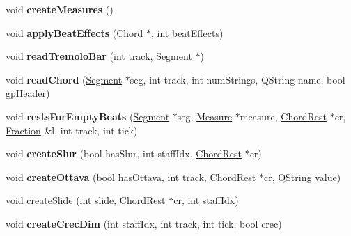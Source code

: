 \begin{DoxyCompactItemize}
void {\bfseries create\+Measures} ()
\item 
\mbox{\label{class_ms_1_1_guitar_pro_a2a10d91cf38b9907d4e0c8228d8aed84}} 
void {\bfseries apply\+Beat\+Effects} (\hyperlink{class_ms_1_1_chord}{Chord} $\ast$, int beat\+Effects)
\item 
\mbox{\label{class_ms_1_1_guitar_pro_ac02cde422c4d7a697468e50bd353ec20}} 
void {\bfseries read\+Tremolo\+Bar} (int track, \hyperlink{class_ms_1_1_segment}{Segment} $\ast$)
\item 
\mbox{\label{class_ms_1_1_guitar_pro_a2683e240afc7efdda4b6d5f6df79ca17}} 
void {\bfseries read\+Chord} (\hyperlink{class_ms_1_1_segment}{Segment} $\ast$seg, int track, int num\+Strings, Q\+String name, bool gp\+Header)
\item 
\mbox{\label{class_ms_1_1_guitar_pro_ae9cdeac65b3ed3186dffb8142d3d22ba}} 
void {\bfseries rests\+For\+Empty\+Beats} (\hyperlink{class_ms_1_1_segment}{Segment} $\ast$seg, \hyperlink{class_ms_1_1_measure}{Measure} $\ast$measure, \hyperlink{class_ms_1_1_chord_rest}{Chord\+Rest} $\ast$cr, \hyperlink{class_ms_1_1_fraction}{Fraction} \&l, int track, int tick)
\item 
\mbox{\label{class_ms_1_1_guitar_pro_a2565655ccf05ed959595bbe9b93116b6}} 
void {\bfseries create\+Slur} (bool has\+Slur, int staff\+Idx, \hyperlink{class_ms_1_1_chord_rest}{Chord\+Rest} $\ast$cr)
\item 
\mbox{\label{class_ms_1_1_guitar_pro_af3ac5e43246916501532a28e4c4d4256}} 
void {\bfseries create\+Ottava} (bool has\+Ottava, int track, \hyperlink{class_ms_1_1_chord_rest}{Chord\+Rest} $\ast$cr, Q\+String value)
\item 
void \hyperlink{class_ms_1_1_guitar_pro_a6623aae1b412483122065e15fdc5e838}{create\+Slide} (int slide, \hyperlink{class_ms_1_1_chord_rest}{Chord\+Rest} $\ast$cr, int staff\+Idx)
\item 
\mbox{\label{class_ms_1_1_guitar_pro_a62213fc1c540ba3d850b6905cd616be7}} 
void {\bfseries create\+Crec\+Dim} (int staff\+Idx, int track, int tick, bool crec)
\item 

\end{DoxyCompactItemize}
